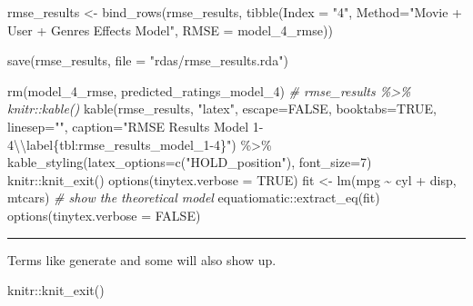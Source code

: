 \documentclass[
]{article}
\newenvironment{Shaded}{}{}
\newcommand{\AttributeTok}[1]{\textcolor[rgb]{0.49,0.56,0.16}{#1}}
\newcommand{\CommentTok}[1]{\textcolor[rgb]{0.38,0.63,0.69}{\textit{#1}}}
\newcommand{\ConstantTok}[1]{\textcolor[rgb]{0.53,0.00,0.00}{#1}}
\newcommand{\DecValTok}[1]{\textcolor[rgb]{0.25,0.63,0.44}{#1}}
\newcommand{\FunctionTok}[1]{\textcolor[rgb]{0.02,0.16,0.49}{#1}}
\newcommand{\NormalTok}[1]{#1}
\newcommand{\OtherTok}[1]{\textcolor[rgb]{0.00,0.44,0.13}{#1}}
\newcommand{\SpecialCharTok}[1]{\textcolor[rgb]{0.25,0.44,0.63}{#1}}
\newcommand{\StringTok}[1]{\textcolor[rgb]{0.25,0.44,0.63}{#1}}
\begin{document}
\begin{Shaded}
\begin{Highlighting}[]
\NormalTok{rmse\_results }\OtherTok{\textless{}{-}} \FunctionTok{bind\_rows}\NormalTok{(rmse\_results,}
                          \FunctionTok{tibble}\NormalTok{(}\AttributeTok{Index =} \StringTok{"4"}\NormalTok{, }\AttributeTok{Method=}\StringTok{"Movie + User + Genres Effects Model"}\NormalTok{,  }
                                 \AttributeTok{RMSE =}\NormalTok{ model\_4\_rmse))}

\FunctionTok{save}\NormalTok{(rmse\_results, }\AttributeTok{file =} \StringTok{"rdas/rmse\_results.rda"}\NormalTok{)}

\FunctionTok{rm}\NormalTok{(model\_4\_rmse, predicted\_ratings\_model\_4)}
\CommentTok{\# rmse\_results \%\textgreater{}\% knitr::kable()}
  \FunctionTok{kable}\NormalTok{(rmse\_results, }\StringTok{"latex"}\NormalTok{, }\AttributeTok{escape=}\ConstantTok{FALSE}\NormalTok{, }\AttributeTok{booktabs=}\ConstantTok{TRUE}\NormalTok{, }\AttributeTok{linesep=}\StringTok{""}\NormalTok{, }\AttributeTok{caption=}\StringTok{"RMSE Results Model 1{-}4}\SpecialCharTok{\textbackslash{}\textbackslash{}}\StringTok{label\{tbl:rmse\_results\_model\_1{-}4\}"}\NormalTok{) }\SpecialCharTok{\%\textgreater{}\%}
    \FunctionTok{kable\_styling}\NormalTok{(}\AttributeTok{latex\_options=}\FunctionTok{c}\NormalTok{(}\StringTok{"HOLD\_position"}\NormalTok{), }\AttributeTok{font\_size=}\DecValTok{7}\NormalTok{)}
\NormalTok{    knitr}\SpecialCharTok{::}\FunctionTok{knit\_exit}\NormalTok{()}
\FunctionTok{options}\NormalTok{(}\AttributeTok{tinytex.verbose =} \ConstantTok{TRUE}\NormalTok{)}
\NormalTok{fit }\OtherTok{\textless{}{-}} \FunctionTok{lm}\NormalTok{(mpg }\SpecialCharTok{\textasciitilde{}}\NormalTok{ cyl }\SpecialCharTok{+}\NormalTok{ disp, mtcars)}
\CommentTok{\# show the theoretical model}
\NormalTok{equatiomatic}\SpecialCharTok{::}\FunctionTok{extract\_eq}\NormalTok{(fit)}
\FunctionTok{options}\NormalTok{(}\AttributeTok{tinytex.verbose =} \ConstantTok{FALSE}\NormalTok{)}
\end{Highlighting}
\end{Shaded}

\begin{center}\rule{0.5\linewidth}{0.5pt}\end{center}

\newpage

Terms like generate and some will also
show up.

\printindex

\begin{Shaded}
\begin{Highlighting}[]
\NormalTok{    knitr}\SpecialCharTok{::}\FunctionTok{knit\_exit}\NormalTok{()}
\end{Highlighting}
\end{Shaded}
\end{document}
